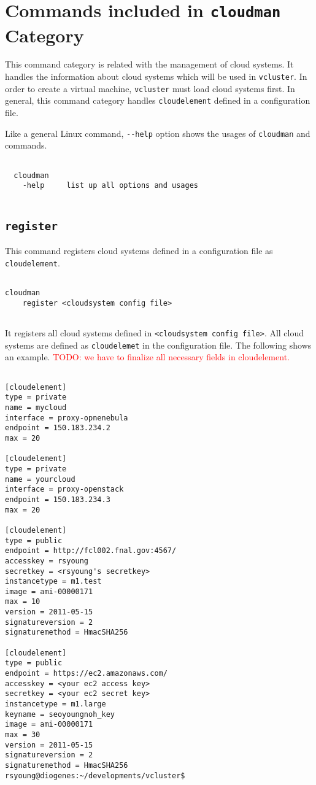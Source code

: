 \documentclass[11pt]{article}
\def \ttt{\texttt}
\def \vb{\verb}
\begin{document}
\section{Commands included in \ttt{cloudman} Category}

This command category is related with the management of cloud systems. It handles the information about cloud systems which will be used in \vb+vcluster+. In order to create a virtual machine, \vb+vcluster+ must load cloud systems first. In general, this command category handles \vb+cloudelement+ defined in a configuration file.

Like a general Linux command, \vb+--help+ option shows the usages of \vb+cloudman+ and commands.

\begin{Verbatim}[fontfamily=courier, fontsize = \small, obeytabs
=true, tabsize=4, frame=lines]

  cloudman 
    -help     list up all options and usages
  
\end{Verbatim}


\subsection{\ttt{register}}
This command registers cloud systems defined in a configuration file as \vb+cloudelement+. 

\begin{Verbatim}[fontfamily=courier, fontsize = \small, obeytabs
=true, tabsize=4, frame=lines]

cloudman 
    register <cloudsystem config file>
      
\end{Verbatim}

It registers all cloud systems defined in \vb+<cloudsystem config file>+. All cloud systems are defined as \vb+cloudelemet+ in the configuration file. The following shows an example. \textcolor{red}{TODO: we have to finalize all necessary fields in cloudelement.}

\begin{Verbatim}[fontfamily=courier, fontsize = \small, obeytabs
=true, tabsize=4, frame=lines]

[cloudelement]
type = private
name = mycloud
interface = proxy-opnenebula
endpoint = 150.183.234.2
max = 20

[cloudelement]
type = private
name = yourcloud
interface = proxy-openstack
endpoint = 150.183.234.3
max = 20

[cloudelement]
type = public
endpoint = http://fcl002.fnal.gov:4567/
accesskey = rsyoung
secretkey = <rsyoung's secretkey>
instancetype = m1.test
image = ami-00000171
max = 10
version = 2011-05-15
signatureversion = 2
signaturemethod = HmacSHA256

[cloudelement]
type = public
endpoint = https://ec2.amazonaws.com/
accesskey = <your ec2 access key>
secretkey = <your ec2 secret key>
instancetype = m1.large
keyname = seoyoungnoh_key 
image = ami-00000171
max = 30
version = 2011-05-15
signatureversion = 2
signaturemethod = HmacSHA256
rsyoung@diogenes:~/developments/vcluster$ 
      
\end{Verbatim}
\end{document}
